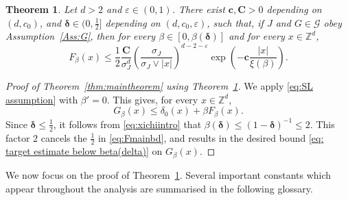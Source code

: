 \documentclass[11pt,a4paper]{article}
\numberwithin{equation}{section}
\theoremstyle{plain}
\newtheorem{Thm}{Theorem}[section]
\theoremstyle{definition}
\newcommand\1{\mathds{1}}
\newcommand\bfc{\mathbf{c}}
\newcommand\bfC{\mathbf{C}}
\newcommand{\deltamain}{\boldsymbol{\delta}}
\begin{document}
\begin{Thm}
\label{thm:bound on F}
Let $d>2$ and $\varepsilon\in (0,1)$.
There exist $\bfc,\bfC>0$ depending on $(d,c_0)$,
and $\deltamain\in(0,\tfrac{1}{2}]$ depending on $(d,c_0,\varepsilon)$, such that,
if $J$ and $G\in \mathcal G$ obey Assumption~\textup{\ref{Ass:G}},
then for every $\beta\in [0,\beta(\deltamain)]$ and for every $x\in \mathbb Z^d$,
\begin{equation}
\label{eq:Fmainbd}
F_\beta(x)
\leq \frac 12
\frac{\bfC}{\sigma_J^d}\left(\frac{\sigma_J}{\sigma_J\vee|x|}\right)^{d-2-\varepsilon}
\exp\left(- \bfc\frac{|x|}{\xi(\beta)}\right).
\end{equation}
\end{Thm}


\begin{proof}[Proof of Theorem~\textup{\ref{thm:maintheorem}} using Theorem~\textup{\ref{thm:bound on F}}]
We apply \eqref{eq:SL assumption} with $\beta'=0$.
This gives, for every $x\in \mathbb Z^d$,
\begin{equation}
	G_\beta(x)\leq \delta_0(x)+\beta F_\beta(x).
\end{equation}
Since $\deltamain\leq \tfrac{1}{2}$, it follows from
\eqref{eq:xichiintro}
that $\beta(\deltamain)\leq (1-\deltamain)^{-1}\leq 2$.
This factor $2$ cancels the $\frac 12$ in \eqref{eq:Fmainbd},
and results in the desired bound \eqref{eq: target estimate below beta(delta)}
on $G_\beta(x)$.
\end{proof}


We now focus on the proof of Theorem~\textup{\ref{thm:bound on F}}. Several important constants which appear throughout the analysis
are summarised in the following glossary.
\end{document}
